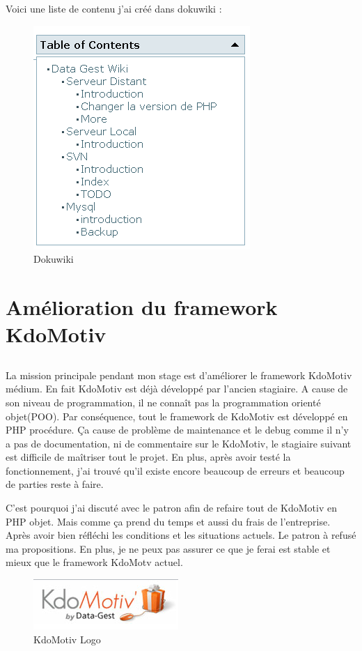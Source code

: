 Voici une liste de contenu j'ai créé dans dokuwiki :
\begin{figure}[hbtp]
\centering
\includegraphics[scale=1]{body/images/dokuwiki-content.png}
\caption{Dokuwiki}
\end{figure}


\newpage
\section[Amélioration KdoMotiv]{Amélioration du framework KdoMotiv}
\subsection*{}
La mission principale pendant mon stage est d'améliorer le framework KdoMotiv médium. En fait KdoMotiv est déjà développé par l'ancien stagiaire. A cause de son niveau de programmation, il ne connaît pas la programmation orienté objet(POO). Par conséquence, tout le framework de KdoMotiv est développé en PHP procédure. Ça cause de problème de maintenance et le debug comme il n'y a pas de documentation, ni de commentaire sur le KdoMotiv, le stagiaire suivant est difficile de maîtriser tout le projet. En plus, après avoir testé la fonctionnement, j'ai trouvé qu'il existe encore beaucoup de erreurs et beaucoup de parties reste à faire.

C'est pourquoi j'ai discuté avec le patron afin de refaire tout de KdoMotiv en PHP objet. Mais comme ça prend du temps et aussi du frais de l'entreprise. Après avoir bien réfléchi les conditions et les situations actuels. Le patron à refusé ma propositions. En plus, je ne peux pas assurer ce que je ferai est stable et mieux que le framework KdoMotv actuel. 

\begin{figure}[hbtp]
\centering
\includegraphics[scale=1]{body/images/kdomotiv.png}
\caption{KdoMotiv Logo}
\end{figure}


